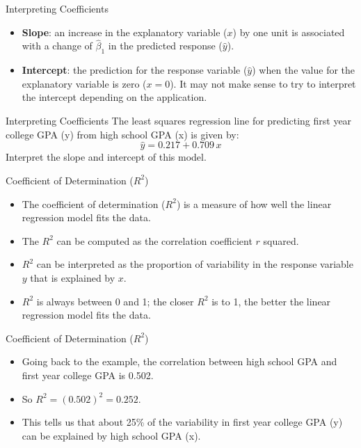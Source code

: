 \documentclass[11pt, fleqn]{beamer}\usepackage[]{graphicx}\usepackage[]{color}
\begin{document}
\begin{frame}{Interpreting Coefficients}
\vspace{-2.5cm}
\begin{itemize}
\item \textbf{Slope}: an increase in the explanatory variable ($x$) by one unit is associated with a change of $\hat{\beta}_1$ in the predicted response ($\hat{y}$).
\vspace{10pt}
\item \textbf{Intercept}: the prediction for the response variable ($\hat{y}$) when the value for the explanatory variable is zero ($x=0$).  It may not make sense to try to interpret the intercept depending on the application.
\end{itemize}
\end{frame}

\begin{frame}{Interpreting Coefficients}
The least squares regression line for predicting first year college GPA (y) from high school GPA (x) is given by:
$$\hat{y} = 0.217 + 0.709\,x$$
Interpret the slope and intercept of this model.
\vspace{4.5cm}
\end{frame}

\begin{frame}{Coefficient of Determination ($R^2$)}
\begin{itemize}
\item The coefficient of determination ($R^2$) is a measure of how well the linear regression model fits the data.
\vspace{5pt}
\item The $R^2$ can be computed as the correlation coefficient $r$ squared.
\vspace{5pt}
\item $R^2$ can be interpreted as the proportion of variability in the response variable $y$ that is explained by $x$.
\vspace{5pt}
\item $R^2$ is always between 0 and 1; the closer $R^2$ is to 1, the better the linear regression model fits the data.
\end{itemize}
\end{frame}

\begin{frame}{Coefficient of Determination ($R^2$)}
\begin{itemize}
\item Going back to the example, the correlation between high school GPA and first year college GPA is 0.502.
\vspace{5pt}
\item So $R^2 = (0.502)^2 = 0.252$.
\vspace{5pt}
\item This tells us that about 25\% of the variability in first year college GPA (y) can be explained by high school GPA (x).
\end{itemize}
\end{frame}
\end{document}
